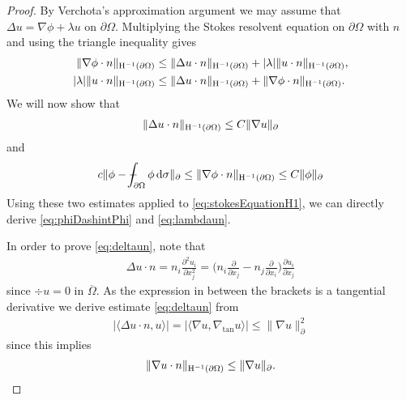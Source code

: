 \begin{proof}
  By Verchota's approximation argument \cite{verchotaDiss} we may assume that $\Delta u = \nabla \phi + \lambda u$ on $\partial\Omega$.
  Multiplying the Stokes resolvent equation on $\partial\Omega$ with $n$ and using the triangle inequality gives
  \begin{align}
    \|\nabla \phi \cdot n\|_{\mathrm{H}^{-1}(\partial\Omega)} 
    &\leq \|\Delta u \cdot n \|_{\mathrm{H}^{-1}(\partial\Omega)} + |\lambda| \| u\cdot n\|_{\mathrm{H}^{-1}(\partial\Omega)}, \nonumber\\
    \label{eq:stokesEquationH1}
    |\lambda| \| u\cdot n \|_{\mathrm{H}^{-1}(\partial\Omega)} 
    &\leq \|\Delta u \cdot n \|_{\mathrm{H}^{-1}(\partial\Omega)} + \|\nabla \phi \cdot n \|_{\mathrm{H}^{-1}(\partial\Omega)}.
  \end{align}
  We will now show that
  \begin{align}
    \label{eq:deltaun}
    \|\Delta u \cdot n\|_{\mathrm{H}^{-1}(\partial\Omega)}
    \leq C \|\nabla u\|_\partial
  \end{align}
  and 
  \begin{align}
    \label{eq:nablaPhin}
    c \| \phi - \dashint_{\partial\Omega} \phi \d\sigma \|_\partial
    \leq \|\nabla \phi \cdot n\|_{\HH^{-1}(\partial\Omega)}
    \leq C \|\phi\|_\partial
  \end{align}
  Using these two estimates applied to \eqref{eq:stokesEquationH1}, we can directly derive \eqref{eq:phiDashintPhi} and \eqref{eq:lambdaun}.

  In order to prove \eqref{eq:deltaun}, note that
  \begin{align*}
    \Delta u \cdot n = n_i \frac{\partial^2 u_i}{\partial x_j^2} = \Big( n_i \frac{\partial}{\partial x_j} - n_j \frac{\partial}{\partial x_i} \Big) \frac{\partial u_i}{\partial x_j}
  \end{align*}
  since $\div u = 0$ in $\overline \Omega$.
  As the expression in between the brackets is a tangential derivative we derive estimate \eqref{eq:deltaun} from
  \begin{align*}
    | \langle \Delta u \cdot n, u \rangle | = | \langle \nabla u, \nabla_{\mathrm{tan}} u \rangle| \leq \|\nabla u\|_\partial^2
  \end{align*}
  since this implies 
  \begin{align*}
    \|\nabla u \cdot  n\|_{\mathrm{H}^{-1}(\partial\Omega)} \leq \|\nabla u\|_\partial.
  \end{align*}


\end{proof}
